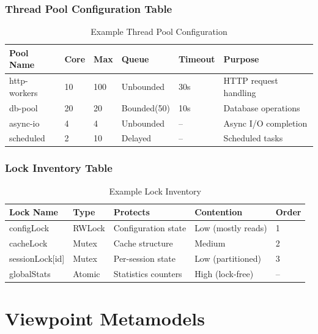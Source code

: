 \documentclass[11pt,letterpaper]{article}
\begin{document}
\subsubsection{Thread Pool Configuration Table}

\begin{table}[H]
\centering
\caption{Example Thread Pool Configuration}
\small
\begin{tabular}{@{}L{2.5cm}L{1.5cm}L{1.5cm}L{2cm}L{2cm}L{3cm}@{}}
\toprule
\textbf{Pool Name} & \textbf{Core} & \textbf{Max} & \textbf{Queue} & \textbf{Timeout} & \textbf{Purpose} \\
\midrule
http-workers & 10 & 100 & Unbounded & 30s & HTTP request handling \\
db-pool & 20 & 20 & Bounded(50) & 10s & Database operations \\
async-io & 4 & 4 & Unbounded & -- & Async I/O completion \\
scheduled & 2 & 10 & Delayed & -- & Scheduled tasks \\
\bottomrule
\end{tabular}
\end{table}

\subsubsection{Lock Inventory Table}

\begin{table}[H]
\centering
\caption{Example Lock Inventory}
\small
\begin{tabular}{@{}L{2.5cm}L{2cm}L{3cm}L{2.5cm}L{2.5cm}@{}}
\toprule
\textbf{Lock Name} & \textbf{Type} & \textbf{Protects} & \textbf{Contention} & \textbf{Order} \\
\midrule
configLock & RWLock & Configuration state & Low (mostly reads) & 1 \\
cacheLock & Mutex & Cache structure & Medium & 2 \\
sessionLock[id] & Mutex & Per-session state & Low (partitioned) & 3 \\
globalStats & Atomic & Statistics counters & High (lock-free) & -- \\
\bottomrule
\end{tabular}
\end{table}

\section{Viewpoint Metamodels}
\end{document}
